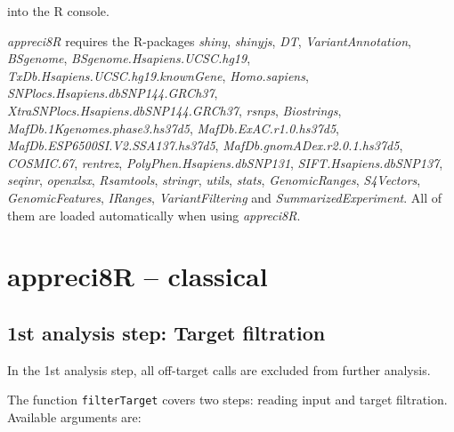 \documentclass{article}
\begin{document}
into the R console.

\emph{appreci8R} requires the R-packages \emph{shiny}, \emph{shinyjs}, \emph{DT}, \emph{VariantAnnotation}, \emph{BSgenome}, \emph{BSgenome.Hsapiens.UCSC.hg19}, \emph{TxDb.Hsapiens.UCSC.hg19.knownGene}, \emph{Homo.sapiens}, \emph{SNPlocs.Hsapiens.dbSNP144.GRCh37}, \emph{XtraSNPlocs.Hsapiens.dbSNP144.GRCh37}, \emph{rsnps}, \emph{Biostrings}, \emph{MafDb.1Kgenomes.phase3.hs37d5}, \emph{MafDb.ExAC.r1.0.hs37d5}, \emph{MafDb.ESP6500SI.V2.SSA137.hs37d5}, \emph{MafDb.gnomADex.r2.0.1.hs37d5}, \emph{COSMIC.67}, \emph{rentrez}, \emph{PolyPhen.Hsapiens.dbSNP131}, \emph{SIFT.Hsapiens.dbSNP137}, \emph{seqinr}, \emph{openxlsx}, \emph{Rsamtools}, \emph{stringr}, \emph{utils}, \emph{stats}, \emph{GenomicRanges}, \emph{S4Vectors}, \emph{GenomicFeatures}, \emph{IRanges}, \emph{VariantFiltering} and \emph{SummarizedExperiment}. All of them are loaded automatically when using \emph{appreci8R}.

\section{appreci8R -- classical}
\subsection{1st analysis step: Target filtration}
In the 1st analysis step, all off-target calls are excluded from further analysis.

The function \texttt{filterTarget} covers two steps: reading input and target filtration. Available arguments are:
\end{document}
